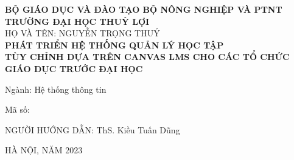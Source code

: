 \documentclass[main-report.tex]{subfiles}
\begin{document}
\begin{titlepage}
\thispagestyle{empty}

\begin{center}
{\bf\large BỘ GIÁO DỤC VÀ ĐÀO TẠO BỘ NÔNG NGHIỆP VÀ PTNT}\\
{\bf\subtitlesize TRƯỜNG ĐẠI HỌC THUỶ LỢI}\\[3cm]


{\large HỌ VÀ TÊN: NGUYỄN TRỌNG THUỶ}\\
\vspace{3\baselineskip}
{\bf\LARGE PHÁT TRIỂN HỆ THỐNG QUẢN LÝ HỌC TẬP}\\
{\bf\LARGE TÙY CHỈNH DỰA TRÊN CANVAS LMS CHO CÁC TỔ CHỨC GIÁO DỤC TRƯỚC ĐẠI HỌC}\\[5cm]
\end{center}

\begin{center}
    {Ngành: Hệ thống thông tin}
\end{center}
\begin{center}
    {Mã số:}
\end{center}
\vspace{4cm}
\begin{center}
    {NGƯỜI HƯỚNG DẪN: ThS. Kiều Tuấn Dũng}
\end{center}
\vspace{4cm}
\begin{center}
{HÀ NỘI, NĂM 2023}
\end{center}
\end{titlepage}
\end{document}

